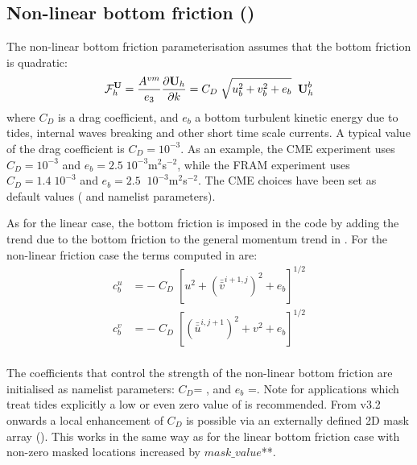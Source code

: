 \documentclass[../main/NEMO_manual]{subfiles}
\begin{document}
\subsection{Non-linear bottom friction (\protect{})}
\label{subsec:ZDF_bfr_nonlinear}

The non-linear bottom friction parameterisation assumes that the bottom friction is quadratic: 
\[
  {\cal F}_h^\textbf{U} = \frac{A^{vm}}{e_3 }\frac{\partial \textbf {U}_h
  }{\partial k}=C_D \;\sqrt {u_b ^2+v_b ^2+e_b } \;\; \textbf {U}_h^b
\]
where $C_D$ is a drag coefficient, and $e_b $ a bottom turbulent kinetic energy due to tides,
internal waves breaking and other short time scale currents.
A typical value of the drag coefficient is $C_D = 10^{-3} $.
As an example, the CME experiment \citep{Treguier_JGR92} uses $C_D = 10^{-3}$ and
$e_b = 2.5\;10^{-3}$m$^2$\;s$^{-2}$, while the FRAM experiment \citep{Killworth1992} uses $C_D = 1.4\;10^{-3}$ and
$e_b =2.5\;\;10^{-3}$m$^2$\;s$^{-2}$.
The CME choices have been set as default values ( and  namelist parameters).

As for the linear case, the bottom friction is imposed in the code by adding the trend due to
the bottom friction to the general momentum trend in .
For the non-linear friction case the terms computed in  are:
\[
  \begin{split}
    c_b^u &= - \; C_D\;\left[ u^2 + \left(\bar{\bar{v}}^{i+1,j}\right)^2 + e_b \right]^{1/2}\\
    c_b^v &= - \; C_D\;\left[  \left(\bar{\bar{u}}^{i,j+1}\right)^2 + v^2 + e_b \right]^{1/2}\\
  \end{split}
\]

The coefficients that control the strength of the non-linear bottom friction are initialised as namelist parameters:
$C_D$= , and $e_b$ =.
Note for applications which treat tides explicitly a low or even zero value of  is recommended.
From v3.2 onwards a local enhancement of $C_D$ is possible via an externally defined 2D mask array
().
This works in the same way as for the linear bottom friction case with non-zero masked locations increased by
$mask\_value$**.
\end{document}
